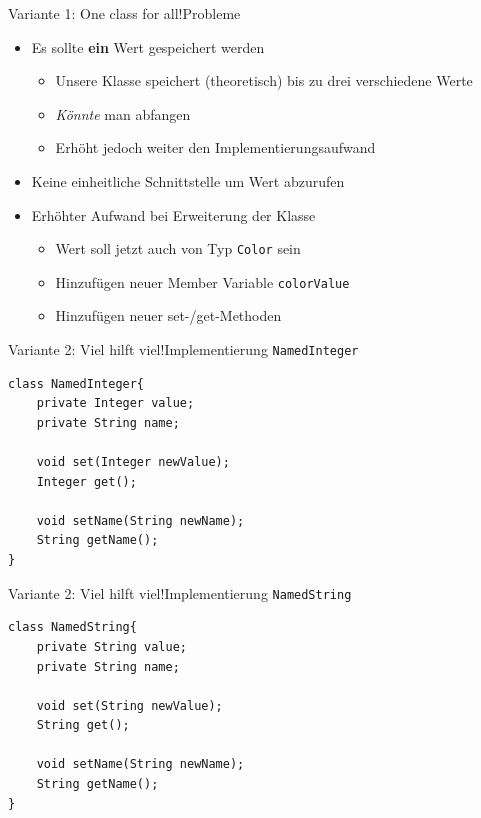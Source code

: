 \begin{frame}{Variante 1: One class for all!}{Probleme}
    \begin{itemize}
        \item Es sollte \textbf{ein} Wert gespeichert werden
            \begin{itemize}
                \item Unsere Klasse speichert (theoretisch) bis zu drei verschiedene Werte
                \item \textit{Könnte} man abfangen
                \item Erhöht jedoch weiter den Implementierungsaufwand
            \end{itemize}
            \item Keine einheitliche Schnittstelle um Wert abzurufen
            \item Erhöhter Aufwand bei Erweiterung der Klasse
            \begin{itemize}
                \item Wert soll jetzt auch von Typ \texttt{Color} sein
                \item Hinzufügen neuer Member Variable \texttt{colorValue}
                \item Hinzufügen neuer set-/get-Methoden
            \end{itemize}
    \end{itemize}
\end{frame}

\begin{frame}[fragile]{Variante 2: Viel hilft viel!}{Implementierung \texttt{NamedInteger}}
\lstset{style=java}
\begin{lstlisting}
class NamedInteger{
    private Integer value;
    private String name;
    
    void set(Integer newValue);
    Integer get();
    
    void setName(String newName);
    String getName();
}
\end{lstlisting}
\end{frame}

\begin{frame}[fragile]{Variante 2: Viel hilft viel!}{Implementierung \texttt{NamedString}}
\lstset{style=java}
\begin{lstlisting}
class NamedString{
    private String value;
    private String name;
    
    void set(String newValue);
    String get();
    
    void setName(String newName);
    String getName();
}
\end{lstlisting}
\end{frame}

